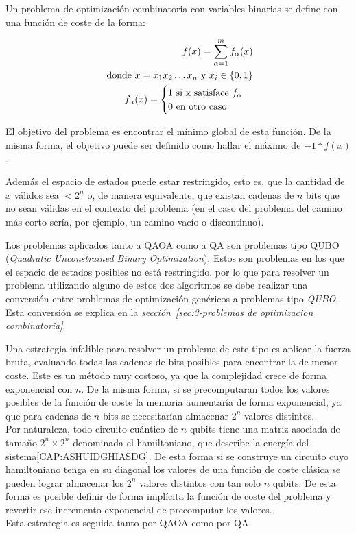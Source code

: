 Un problema de optimización combinatoria con variables binarias se define con una función de coste de la forma:

\begin{align}
  f(x) = \sum_{\alpha = 1}^{m} f_\alpha(x) \\
  \textnormal{ donde } x = x_1x_2 \ldots x_n \textnormal{ y } x_i\in{\{0, 1\}} \nonumber \\
   f_{\alpha}(x) = \begin{cases} \nonumber
     1 \textnormal{ si x satisface } f_\alpha \\
     0 \textnormal{ en otro caso}
   \end{cases}
\end{align}

El objetivo del problema es encontrar el mínimo global de esta función. De la misma forma, el objetivo puede ser definido como hallar el máximo de $-1*f(x)$.

Además el espacio de estados puede estar restringido, esto es, que la cantidad de $x$ válidos sea $< 2^n$ o, de manera equivalente, que existan cadenas de $n$ bits que no sean válidas en el contexto del problema (en el caso del problema del camino más corto sería, por ejemplo, un camino vacío o discontinuo).

Los problemas aplicados tanto a QAOA como a QA son problemas tipo QUBO (\textit{Quadratic Unconstrained Binary Optimization}).
Estos son problemas en los que el espacio de estados posibles no está restringido, por lo que para resolver un problema utilizando alguno de estos dos algoritmos se debe realizar una conversión entre problemas de optimización genéricos a problemas tipo \textit{QUBO}. Esta conversión se explica en la \textit{sección~\ref{sec:3-problemas de optimizacion combinatoria}}.

Una estrategia infalible para resolver un problema de este tipo es aplicar la fuerza bruta, evaluando todas las cadenas de bits posibles para encontrar la de menor coste.
Este es un método muy costoso, ya que la complejidad crece de forma exponencial con $n$.
De la misma forma, si se precomputaran todos los valores posibles de la función de coste la memoria aumentaría de forma exponencial, ya que para cadenas de $n$ bits se necesitarían almacenar $2^n$ valores distintos.
\\
Por naturaleza, todo circuito cuántico de $n$ qubits tiene una matriz asociada de tamaño $2^n \times 2^n$ denominada el hamiltoniano, que describe la energía del sistema\ref{CAP:ASHUIDGHIASDG}.
De esta forma si se construye un circuito cuyo hamiltoniano tenga en su diagonal los valores de una función de coste clásica se pueden lograr almacenar los $2^n$ valores distintos con tan solo $n$ qubits.
De esta forma es posible definir de forma implícita la función de coste del problema y revertir ese incremento exponencial de precomputar los valores.
\\
Esta estrategia es seguida tanto por QAOA como por QA\@.


